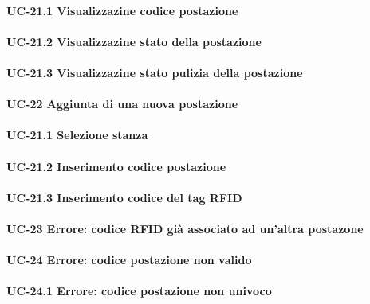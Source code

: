     \paragraph{UC-21.1 Visualizzazine codice postazione}

    \paragraph{UC-21.2 Visualizzazine stato della postazione} %

    \paragraph{UC-21.3 Visualizzazine stato pulizia della postazione} %


\paragraph{UC-22 Aggiunta di una nuova postazione}

    \paragraph{UC-21.1 Selezione stanza}

    \paragraph{UC-21.2 Inserimento codice postazione}

    \paragraph{UC-21.3 Inserimento codice del tag RFID}

\paragraph{UC-23 Errore: codice RFID già associato ad un'altra postazone}

\paragraph{UC-24 Errore: codice postazione non valido}

    \paragraph{UC-24.1 Errore: codice postazione non univoco}
    
